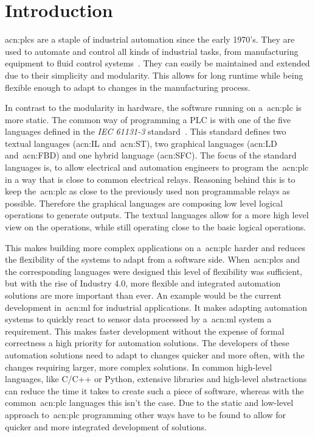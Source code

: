 
\section{Introduction}
\label{sec:Introduction}

\glspl{acn:plc} are a staple of industrial automation since the early 1970's.
They are used to automate and control all kinds of industrial tasks, from manufacturing equipment to fluid control systems~\cite{Erickson:1996aa}.
They can easily be maintained and extended due to their simplicity and modularity.
This allows for long runtime while being flexible enough to adapt to changes in the manufacturing process.

In contrast to the modularity in hardware, the software running on a~\gls{acn:plc} is more static.
The common way of programming a PLC is with one of the five languages defined in the \textit{IEC 61131-3} standard~\cite{Plcopen:61131-3}.
This standard defines two textual languages (\gls{acn:IL} and~\gls{acn:ST}), two graphical languages (\gls{acn:LD} and~\gls{acn:FBD}) and one hybrid language (\gls{acn:SFC}).
The focus of the standard languages is, to allow electrical and automation engineers to program the~\gls{acn:plc} in a way that is close to common electrical relays.
Reasoning behind this is to keep the~\gls{acn:plc} as close to the previously used non programmable relays as possible.
Therefore the graphical languages are composing low level logical operations to generate outputs.
The textual languages allow for a more high level view on the operations, while still operating close to the basic logical operations.

This makes building more complex applications on a~\gls{acn:plc} harder and reduces the flexibility of the systems to adapt from a software side.
When~\glspl{acn:plc} and the corresponding languages were designed this level of flexibility was sufficient, but with the rise of Industry 4.0, more flexible and integrated automation solutions are more important than ever.
An example would be the current development in~\gls{acn:ml} for industrial applications.
It makes adapting automation systems to quickly react to sensor data processed by a~\gls{acn:ml} system a requirement.
This makes faster development without the expense of formal correctness a high priority for automation solutions.
The developers of these automation solutions need to adapt to changes quicker and more often, with the changes requiring larger, more complex solutions.
In common high-level languages, like C/C++ or Python, extensive libraries and high-level abstractions can reduce the time it takes to create such a piece of software, whereas with the common~\gls{acn:plc} languages this isn't the case.
Due to the static and low-level approach to~\gls{acn:plc} programming other ways have to be found to allow for quicker and more integrated development of solutions.

